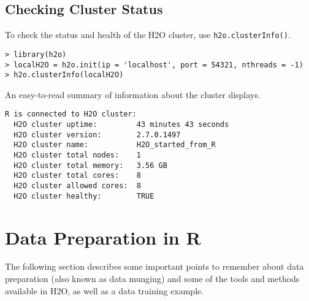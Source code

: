 \subsection{Checking Cluster Status}


To check the status and health of the H2O cluster, use {\texttt{h2o.clusterInfo()}}.
\begin{lstlisting}[style=R]
> library(h2o)
> localH2O = h2o.init(ip = 'localhost', port = 54321, nthreads = -1)
> h2o.clusterInfo(localH2O)
\end{lstlisting}

An easy-to-read summary of information about the cluster displays. 
\begin{lstlisting}[style=R]
R is connected to H2O cluster:
  H2O cluster uptime:         43 minutes 43 seconds
  H2O cluster version:        2.7.0.1497
  H2O cluster name:           H2O_started_from_R
  H2O cluster total nodes:    1
  H2O cluster total memory:   3.56 GB
  H2O cluster total cores:    8
  H2O cluster allowed cores:  8
  H2O cluster healthy:        TRUE
\end{lstlisting}


\section{Data Preparation in R}

The following section describes some important points to remember about data preparation (also known as data munging) and some of the tools and methods available in H2O, as well as a data training example. 

